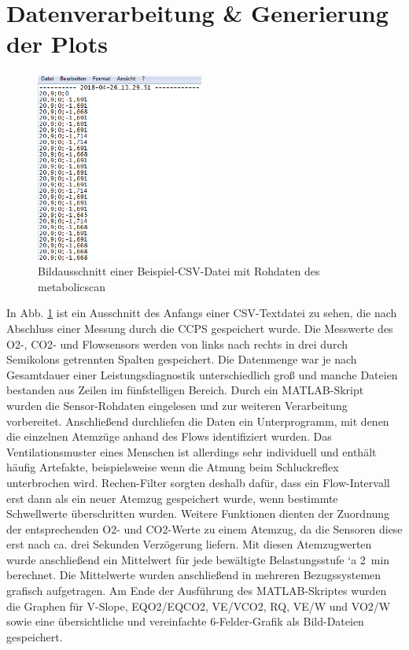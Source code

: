 \section{Datenverarbeitung \& Generierung der Plots}

\begin{figure}[H]
	\centering
	\includegraphics[width=55mm]{Bilder/breathdata.png}
	\caption[Rohdaten des metabolicscan]{Bildausschnitt einer Beispiel-CSV-Datei mit Rohdaten des metabolicscan}
	\label{pic:pic14}
\end{figure}

In Abb. \ref{pic:pic14} ist ein Ausschnitt des Anfangs einer CSV-Textdatei zu sehen, die nach Abschluss einer Messung durch die \acs{CCPS} gespeichert wurde. Die Messwerte des \acs{O2}-, \acs{CO2}- und Flowsensors werden von links nach rechts in drei durch Semikolons getrennten Spalten gespeichert. Die Datenmenge war je nach Gesamtdauer einer Leistungsdiagnostik unterschiedlich groß und manche Dateien bestanden aus Zeilen im fünfstelligen Bereich. Durch ein MATLAB-Skript wurden die Sensor-Rohdaten eingelesen und zur weiteren Verarbeitung vorbereitet. Anschließend durchliefen die Daten ein Unterprogramm, mit denen die einzelnen Atemzüge anhand des Flows identifiziert wurden. Das Ventilationsmuster eines Menschen ist allerdings sehr individuell und enthält häufig Artefakte, beispielsweise wenn die Atmung beim Schluckreflex unterbrochen wird. Rechen-Filter sorgten deshalb dafür, dass ein Flow-Intervall erst dann als ein neuer Atemzug gespeichert wurde, wenn bestimmte Schwellwerte überschritten wurden. Weitere Funktionen dienten der Zuordnung der entsprechenden \acs{O2}- und \acs{CO2}-Werte zu einem Atemzug, da die Sensoren diese erst nach ca. drei Sekunden Verzögerung liefern. Mit diesen Atemzugwerten wurde anschließend ein Mittelwert für jede bewältigte Belastungsstufe `{a} \SI{2}{\minute} berechnet. Die Mittelwerte wurden anschließend in mehreren Bezugssystemen grafisch aufgetragen. Am Ende der Ausführung des MATLAB-Skriptes wurden die Graphen für V-Slope, \acs{EQO2}/\acs{EQCO2}, \acs{VE}/\acs{VCO2}, \acs{RQ}, \acs{VE}/\acs{W} und \acs{VO2}/\acs{W} sowie eine übersichtliche und vereinfachte 6-Felder-Grafik als Bild-Dateien gespeichert. 

